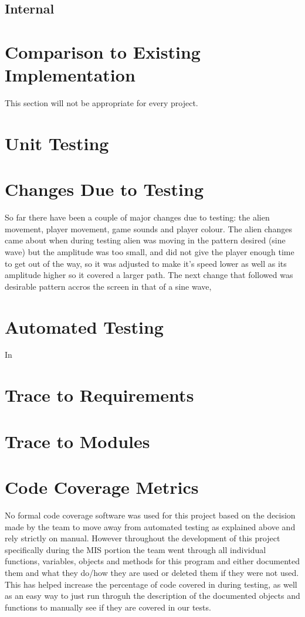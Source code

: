 \documentclass[12pt, titlepage]{article}
\begin{document}
\subsection{Internal}


\section{Comparison to Existing Implementation}

This section will not be appropriate for every project.

\section{Unit Testing}

\section{Changes Due to Testing}
So far there have been a couple of major changes due to testing: the alien movement, player movement, game sounds and player colour. The alien changes came about when during testing  alien was moving in the pattern desired (sine wave) but the amplitude was too small, and did not give the player enough time to get out of the way, so it was adjusted to make it's speed lower as well as its amplitude higher so it covered a larger path. The next change that followed was desirable pattern accros the screen in that of a sine wave,

\section{Automated Testing}
In

\section{Trace to Requirements}

\section{Trace to Modules}

\section{Code Coverage Metrics}
No formal code coverage software was used for this project based on the decision made by the team to move away from automated testing as explained above and rely strictly on manual. However throughout the development of this project specifically during the MIS portion the team went through all individual functions, variables, objects and methods for this program and either documented them and what they do/how they are used or deleted them if they were not used. This has helped increase the percentage of code covered in during testing, as well as an easy way to just run throguh the description of the documented objects and functions to manually see if they are covered in our tests.





\end{document}
